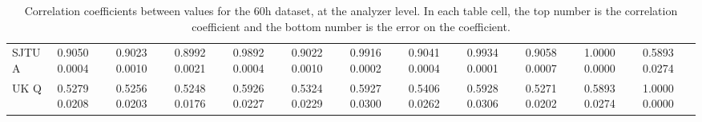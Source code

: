 \begin{landscape}
\begin{table}
\begin{tabularx}{1\linewidth}{@{\extracolsep{\fill}}lXXXXXXXXXXX}
	SJTU A & 0.9050 0.0004 & 0.9023 0.0010 & 0.8992 0.0021 & 0.9892 0.0004 & 0.9022 0.0010 & 0.9916 0.0002 & 0.9041 0.0004 & 0.9934 0.0001 & 0.9058 0.0007 & 1.0000 0.0000 & 0.5893 0.0274  \\
	UK Q   & 0.5279 0.0208 & 0.5256 0.0203 & 0.5248 0.0176 & 0.5926 0.0227 & 0.5324 0.0229 & 0.5927 0.0300 & 0.5406 0.0262 & 0.5928 0.0306 & 0.5271 0.0202 & 0.5893 0.0274 & 1.0000 0.0000  \\
  \bottomrule
\end{tabularx}
\caption[]{Correlation coefficients between \R values for the 60h dataset, at the analyzer level. In each table cell, the top number is the correlation coefficient and the bottom number is the error on the coefficient.}
\label{tab:Corrs_60h_analyzer}
\end{table}
\end{landscape}






